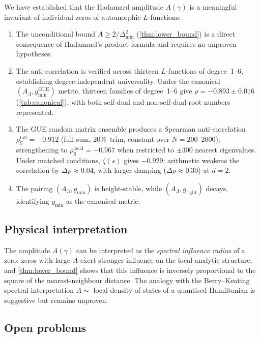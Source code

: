 \documentclass[11pt,a4paper]{article}
\theoremstyle{plain}
\theoremstyle{definition}
\DeclareMathOperator{\GUE}{GUE}
\newcommand{\La}{\Lambda}
\begin{document}
We have established that the Hadamard amplitude $A(\gamma)$ is a
meaningful invariant of individual zeros of automorphic $L$-functions:
\begin{enumerate}[label=(\roman*)]
  \item The unconditional bound $A \ge 2/\Delta_{\min}^2$
        (\cref{thm:lower_bound}) is a direct consequence of
        Hadamard's product formula and requires no unproven hypotheses.
  \item The anti-correlation is verified across thirteen $L$-functions
        of degree~1--6, establishing degree-independent universality.
        Under the canonical $(A_\La, g_{\min}^{\GUE})$ metric,
        thirteen families of degree~1--6 give $\rho = -0.893 \pm 0.016$
        (\cref{tab:canonical}), with both self-dual and non-self-dual
        root numbers represented.
  \item The GUE random matrix ensemble produces a Spearman
        anti-correlation $\rho_{\mathrm{S}}^{\text{full}} = -0.912$
        (full sum, $20\%$~trim, constant over $N = 200$--$2000$),
        strengthening to $\rho_{\mathrm{S}}^{\text{local}} = -0.967$
        when restricted to $\pm 300$ nearest eigenvalues.
        Under matched conditions, $\zeta(s)$ gives $-0.929$:
        arithmetic weakens the correlation by $\Delta\rho \approx 0.04$,
        with larger damping ($\Delta\rho \approx 0.30$) at $d = 2$.
  \item The pairing $(A_\La, g_{\min})$ is height-stable,
        while $(A_\La, g_{\mathrm{right}})$ decays, identifying
        $g_{\min}$ as the canonical metric.
\end{enumerate}

\subsection{Physical interpretation}

The amplitude $A(\gamma)$ can be interpreted as the
\emph{spectral influence radius} of a zero: zeros with large $A$
exert stronger influence on the local analytic structure, and
\cref{thm:lower_bound} shows that this influence is inversely
proportional to the square of the nearest-neighbour distance.
The analogy with the Berry--Keating spectral interpretation
$A \sim$ local density of states of a quantised Hamiltonian
is suggestive but remains unproven.

\subsection{Open problems}
\end{document}
